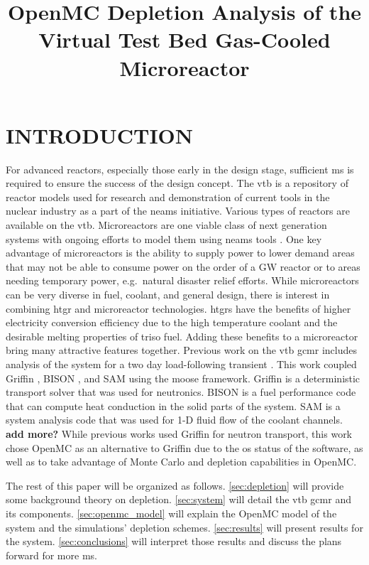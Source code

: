 \documentclass[letterpaper]{physor2024}
\title{OpenMC Depletion Analysis of the Virtual Test Bed Gas-Cooled Microreactor}
\begin{document}
\section{INTRODUCTION}\label{sec:intro}
For advanced reactors, especially those early in the design stage, sufficient \gls{ms} is required to ensure the success of the design concept. The \gls{vtb} \cite{vtb2023} is a repository of reactor models used for research and demonstration of current tools in the nuclear industry as a part of the \gls{neams} initiative. Various types of reactors are available on the \gls{vtb}. Microreactors are one viable class of next generation systems with ongoing efforts to model them using \gls{neams} tools \cite{Stauff-preliminary-applications-2021, Stauff-applications-2022}. One key advantage of microreactors is the ability to supply power to lower demand areas that may not be able to consume power on the order of a GW reactor or to areas needing temporary power, e.g.~natural disaster relief efforts. While microreactors can be very diverse in fuel, coolant, and general design, there is interest in combining \gls{htgr} and microreactor technologies. \glspl{htgr} have the benefits of higher electricity conversion efficiency due to the high temperature coolant and the desirable melting properties of \gls{triso} fuel. Adding these benefits to a microreactor bring many attractive features together. Previous work on the \gls{vtb} \gls{gcmr} includes analysis of the system for a two day load-following transient \cite{Abdelhameed-ANS-2022}. This work coupled Griffin \cite{GRIFFIN}, BISON \cite{BISON}, and SAM \cite{SAM} using the \gls{moose} framework. Griffin is a deterministic transport solver that was used for neutronics. BISON is a fuel performance code that can compute heat conduction in the solid parts of the system. SAM is a system analysis code that was used for 1-D fluid flow of the coolant channels. \textbf{add more?} While previous works used Griffin for neutron transport, this work chose OpenMC as an alternative to Griffin due to the \gls{os} status of the software, as well as to take advantage of Monte Carlo and depletion capabilities in OpenMC.

The rest of this paper will be organized as follows. \cref{sec:depletion} will provide some background theory on depletion. \cref{sec:system} will detail the \gls{vtb} \gls{gcmr} and its components. \cref{sec:openmc_model} will explain the OpenMC model of the system and the simulations' depletion schemes. \cref{sec:results} will present results for the system. \cref{sec:conclusions} will interpret those results and discuss the plans forward for more \gls{ms}.
\end{document}

